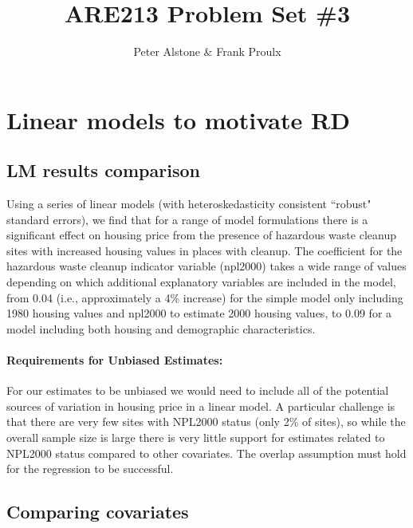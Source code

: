 \documentclass[letterpaper, 12pt]{article}
\begin{document}
\title{ARE213 Problem Set \#3}
\author{Peter Alstone \& Frank Proulx}
\maketitle

\section{Linear models to motivate RD}

\subsection{LM results comparison}



Using a series of linear models (with heteroskedasticity consistent ``robust" standard errors), we find that for a range of model formulations there is a significant effect on housing price from the presence of hazardous waste cleanup sites with increased housing values in places with cleanup.  The coefficient for the hazardous waste cleanup indicator variable (npl2000) takes a wide range of values depending on which additional explanatory variables are included in the model, from 0.04 (i.e., approximately a 4\% increase) for the simple model only including 1980 housing values and npl2000 to estimate 2000 housing values, to 0.09 for a model including both housing and demographic characteristics.  

\paragraph{Requirements for Unbiased Estimates:}For our estimates to be unbiased we would need to include all of the potential sources of variation in housing price in a linear model.  A particular challenge is that there are very few sites with NPL2000 status (only 2\% of sites), so while the overall sample size is large there is very little support for estimates related to NPL2000 status compared to other covariates.  The overlap assumption must hold for the regression to be successful.  

\subsection{Comparing covariates}
\end{document}
